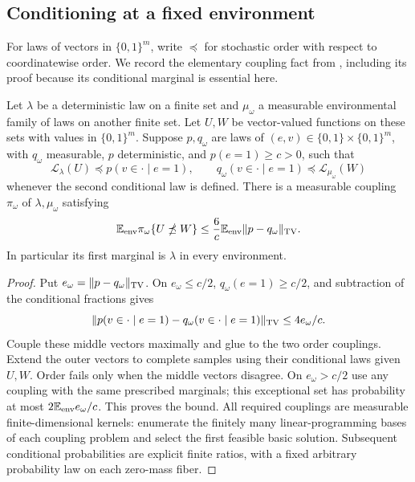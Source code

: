\subsection{Conditioning at a fixed environment}

For laws of vectors in $\{0,1\}^m$, write $\preceq$ for stochastic
order with respect to coordinatewise order.  We record the elementary
coupling fact from \cite[Section~9, Lemma ``Conditioning and gluing at
fixed environment'']{R}, including its proof because its conditional
marginal is essential here.

\begin{lemma}
\label{lem:conditional-gluing}
Let $\lambda$ be a deterministic law on a finite set and $\mu_\omega$
a measurable environmental family of laws on another finite set.
Let $U,W$ be vector-valued functions on these sets with values in
$\{0,1\}^m$.  Suppose $p,q_\omega$ are laws of
$(e,v)\in\{0,1\}\times\{0,1\}^m$, with $q_\omega$ measurable,
$p$ deterministic, and
$p(e=1)\ge c>0$, such that
\[
 \mathcal L_\lambda(U)\preceq p(v\in\cdot\mid e=1),\qquad
 q_\omega(v\in\cdot\mid e=1)\preceq\mathcal L_{\mu_\omega}(W)
\]
whenever the second conditional law is defined.  There is a measurable
coupling $\pi_\omega$ of $\lambda,\mu_\omega$ satisfying
\[
 \mathbb E_{\rm env}\pi_\omega\{U\npreceq W\}
 \le \frac{6}{c}\mathbb E_{\rm env}\|p-q_\omega\|_{\operatorname{TV}}.
\]
In particular its first marginal is $\lambda$ in every environment.
\end{lemma}

\begin{proof}
Put $e_\omega=\|p-q_\omega\|_{\operatorname{TV}}$.  On $e_\omega\le c/2$,
$q_\omega(e=1)\ge c/2$, and subtraction of the conditional fractions
gives
\[
 \|p(v\in\cdot\mid e=1)-q_\omega(v\in\cdot\mid e=1)\|_{\operatorname{TV}}
 \le 4e_\omega/c.
\]
Couple these middle vectors maximally and glue to the two order
couplings.  Extend the outer vectors to complete samples using their
conditional laws given $U,W$.  Order fails only when the middle
vectors disagree.  On $e_\omega>c/2$ use any coupling with the same
prescribed marginals; this exceptional set has probability at most
$2\mathbb E_{\rm env}e_\omega/c$.  This proves the bound.  All required
couplings are measurable finite-dimensional kernels: enumerate the
finitely many linear-programming bases of each coupling problem and
select the first feasible basic solution.  Subsequent conditional
probabilities are explicit finite ratios, with a fixed arbitrary
probability law on each zero-mass fiber.
\end{proof}

